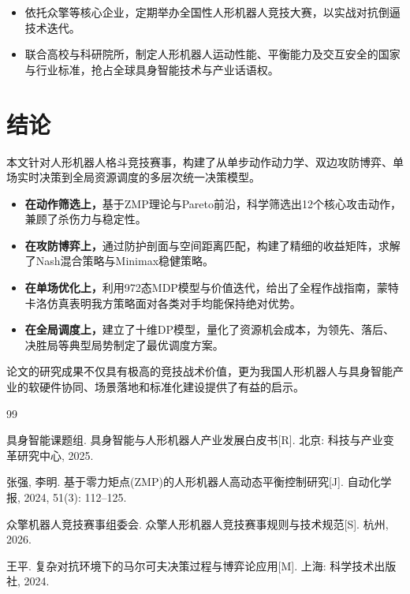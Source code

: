 \documentclass[a4paper,12pt]{article}
\numberwithin{equation}{section}
\numberwithin{table}{section}
\numberwithin{figure}{section}
\begin{document}
\begin{itemize}
    \item 依托众擎等核心企业，定期举办全国性人形机器人竞技大赛，以实战对抗倒逼技术迭代。
    \item 联合高校与科研院所，制定人形机器人运动性能、平衡能力及交互安全的国家与行业标准，抢占全球具身智能技术与产业话语权。
\end{itemize}

\section{结论}

本文针对人形机器人格斗竞技赛事，构建了从单步动作动力学、双边攻防博弈、单场实时决策到全局资源调度的多层次统一决策模型。

\begin{itemize}
    \item \textbf{在动作筛选上，}基于ZMP理论与Pareto前沿，科学筛选出12个核心攻击动作，兼顾了杀伤力与稳定性。
    \item \textbf{在攻防博弈上，}通过防护剖面与空间距离匹配，构建了精细的收益矩阵，求解了Nash混合策略与Minimax稳健策略。
    \item \textbf{在单场优化上，}利用972态MDP模型与价值迭代，给出了全程作战指南，蒙特卡洛仿真表明我方策略面对各类对手均能保持绝对优势。
    \item \textbf{在全局调度上，}建立了十维DP模型，量化了资源机会成本，为领先、落后、决胜局等典型局势制定了最优调度方案。
\end{itemize}

论文的研究成果不仅具有极高的竞技战术价值，更为我国人形机器人与具身智能产业的软硬件协同、场景落地和标准化建设提供了有益的启示。

\begin{thebibliography}{99}

具身智能课题组. 具身智能与人形机器人产业发展白皮书[R]. 北京: 科技与产业变革研究中心, 2025.

张强, 李明. 基于零力矩点(ZMP)的人形机器人高动态平衡控制研究[J]. 自动化学报, 2024, 51(3): 112--125.

众擎机器人竞技赛事组委会. 众擎人形机器人竞技赛事规则与技术规范[S]. 杭州, 2026.

王平. 复杂对抗环境下的马尔可夫决策过程与博弈论应用[M]. 上海: 科学技术出版社, 2024.

\end{thebibliography}
\end{document}
